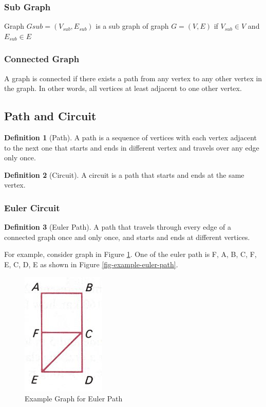 \documentclass{article}
\theoremstyle{plain}%
\theoremstyle{definition}
\newtheorem{defn}{Definition}[section]
\theoremstyle{remark}
\begin{document}
	\subsubsection{Sub Graph}

	Graph $Gsub = (V_{sub}, E_{sub})$ is a sub graph of graph $G = (V, E)$ if $V_{sub} \in V$ and $E_{sub} \in E$

	\subsubsection{Connected Graph}

	A graph is connected if there exists a path from any vertex to any other vertex in the graph. In other words, all vertices at least adjacent to one other vertex.

	\subsection{Path and Circuit}

	\begin{defn}[Path]
		A path is a sequence of vertices with each vertex adjacent to the next one that starts and ends in different vertex and travels over any edge only once.
	\end{defn}

	\begin{defn}[Circuit]
		A circuit is a path that starts and ends at the same vertex.
	\end{defn}

	\subsubsection{Euler Circuit}

	\begin{defn}[Euler Path]
		A path that travels through every edge of a connected graph once and only once, and starts and ends at different vertices.
	\end{defn}

	For example, consider graph in Figure \ref{fig-graph-with-euler-path}. One of the euler path is F, A, B, C, F, E, C, D, E as shown in Figure \ref{fig-example-euler-path}.

	\begin{figure}[htbp]
		\center
		\includegraphics[scale=0.5]{img/euler-path-graph.png}
		\caption{Example Graph for Euler Path}
		\label{fig-graph-with-euler-path}
	\end{figure}
\end{document}

